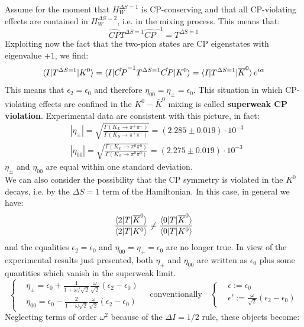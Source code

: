 \documentclass[../main.tex]{subfiles}
\begin{document}
Assume for the moment that $H_W^{\Delta S=1}$ is CP-conserving and that all CP-violating effects are contained in $H_W^{\Delta S=2}$, i.e. in the mixing process. This means that:
\[
\hat{CP}T^{\Delta S=1}\hat{CP}^{-1}=T^{\Delta S=1}
\]
Exploiting now the fact that the two-pion states are CP eigenstates with eigenvalue $+1$, we find:
\[
\braket{I|T^{\Delta S=1}|K^0}=\braket{I|\hat{CP}^{-1}T^{\Delta S=1}\hat{CP}|K^0}=\braket{I|T^{\Delta S=1}|\overline{K}^0}e^{i\alpha}
\]
This means that $\epsilon_2=\epsilon_0$ and therefore $\eta_{00}=\eta_\pm=\epsilon_0$. This situation in which CP-violating effects are confined in the $K^0-\overline{K}^0$ mixing is called \textbf{superweak CP violation}. Experimental data are consistent with this picture, in fact:
\[
\begin{aligned}
&|\eta_\pm|=\sqrt{\frac{\Gamma(K_L\to\pi^+\pi^-)}{\Gamma(K_S\to\pi^+\pi^-)}}=(2.285\pm0.019)\cdot10^{-3}\\
&|\eta_{00}|=\sqrt{\frac{\Gamma(K_L\to\pi^0\pi^0)}{\Gamma(K_S\to\pi^0\pi^0)}}=(2.275\pm0.019)\cdot10^{-3}
\end{aligned}
\]
$\eta_\pm$ and $\eta_{00}$ are equal within one standard deviation.\\
We can also consider the possibility that the CP symmetry is violated in the $K^0$ decays, i.e. by the $\Delta S=1$ term of the Hamiltonian. In this case, in general we have:
\[
\frac{\braket{2|T|\overline{K}^0}}{\braket{2|T|K^0}}\neq\frac{\braket{0|T|\overline{K}^0}}{\braket{0|T|K^0}}
\]
and the equalities $\epsilon_2=\epsilon_0$ and $\eta_{00}=\eta_\pm=\epsilon_0$ are no longer true. In view of the experimental results just presented, both $\eta_\pm$ and $\eta_{00}$ are written as $\epsilon_0$ plus some quantities which vanish in the superweak limit.
\[
\left\{
\begin{aligned}
&\eta_\pm=\epsilon_0+\frac{1}{1+\omega/\sqrt{2}}\frac{\omega}{\sqrt{2}}(\epsilon_2-\epsilon_0)\\
&\eta_{00}=\epsilon_0-\frac{2}{1-\omega\sqrt{2}}\frac{\omega}{\sqrt{2}}(\epsilon_2-\epsilon_0)
\end{aligned}
\right.
\quad\text{conventionally}\quad
\left\{
\begin{aligned}
&\epsilon:=\epsilon_0\\
&\epsilon':=\frac{\omega}{\sqrt{2}}(\epsilon_2-\epsilon_0)
\end{aligned}
\right.
\]
Neglecting terms of order $\omega^2$ because of the $\Delta I=1/2$ rule, these objects become:
\end{document}
